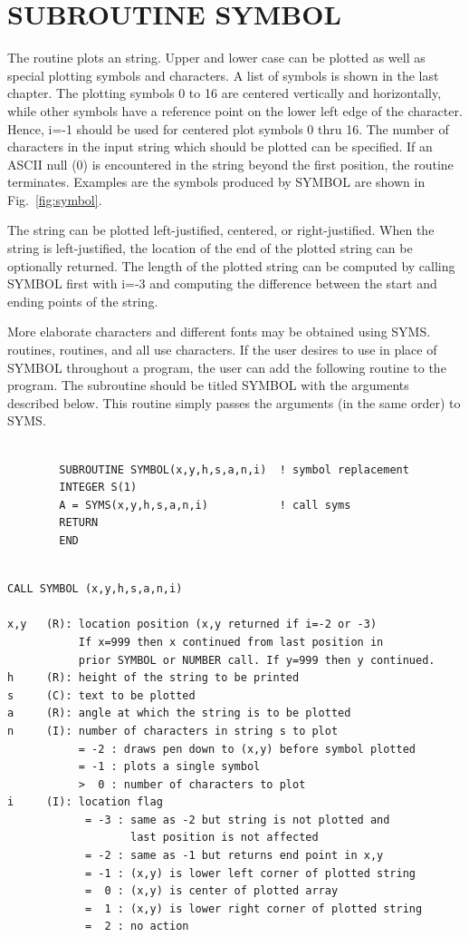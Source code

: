 \documentclass[11pt]{report}
\begin{document}
\section{SUBROUTINE SYMBOL}

The  routine plots an  string.  Upper and lower
case  can be plotted as well as special plotting symbols
and characters.  A list of symbols is shown in the last chapter.  The
plotting symbols 0 to 16 are centered vertically and horizontally,
while other symbols have a reference point on the lower left edge of
the character. Hence, i=-1 should be used for centered plot symbols 0
thru 16.  The number of characters in the input string which should be
plotted can be specified.  If an ASCII null (0) is encountered in the
string beyond the first position, the routine terminates. Examples are
the symbols produced by SYMBOL are shown in Fig.~\ref{fig:symbol}.

The string can be plotted left-justified, centered, or right-justified.
When the string is left-justified, the location of the end of the
plotted string can be optionally returned.  The length of the
plotted string can be computed by calling SYMBOL first with i=-3
and computing the difference between the start and ending points of the
string.

More elaborate characters and different fonts may be obtained using
SYMS.  routines,  routines, and  all
use  characters.  If the user desires to use  in
place of SYMBOL throughout a program, the user can add the following
routine to the program.  The subroutine should be titled SYMBOL with
the arguments described below.  This routine simply passes the
arguments (in the same order) to SYMS.
\begin{verbatim}

        SUBROUTINE SYMBOL(x,y,h,s,a,n,i)  ! symbol replacement
        INTEGER S(1)
        A = SYMS(x,y,h,s,a,n,i)           ! call syms
        RETURN
        END
\end{verbatim}
\begin{verbatim}

CALL SYMBOL (x,y,h,s,a,n,i)

x,y   (R): location position (x,y returned if i=-2 or -3)
           If x=999 then x continued from last position in
           prior SYMBOL or NUMBER call. If y=999 then y continued.
h     (R): height of the string to be printed
s     (C): text to be plotted 
a     (R): angle at which the string is to be plotted
n     (I): number of characters in string s to plot
           = -2 : draws pen down to (x,y) before symbol plotted
           = -1 : plots a single symbol
           >  0 : number of characters to plot
i     (I): location flag
            = -3 : same as -2 but string is not plotted and
                   last position is not affected
            = -2 : same as -1 but returns end point in x,y
            = -1 : (x,y) is lower left corner of plotted string
            =  0 : (x,y) is center of plotted array
            =  1 : (x,y) is lower right corner of plotted string
            =  2 : no action
\end{verbatim}
\end{document}
